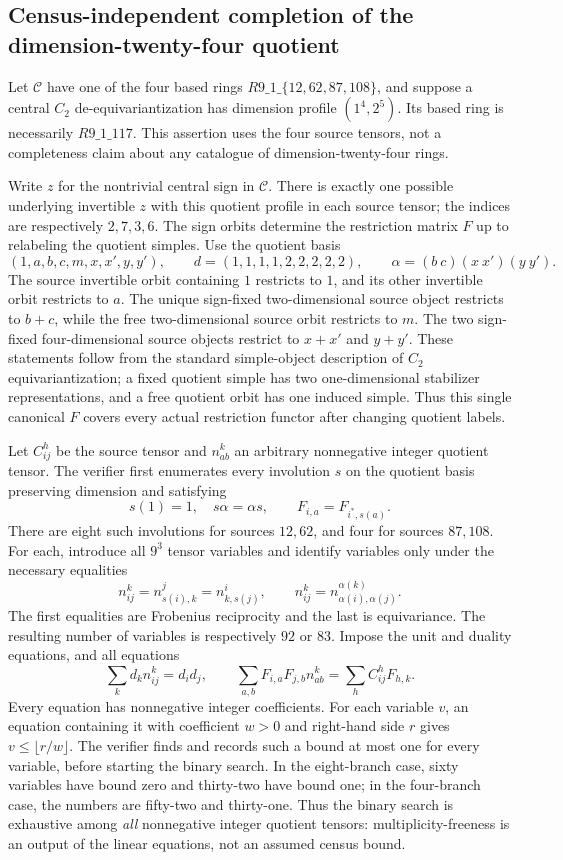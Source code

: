 \subsection{Census-independent completion of the dimension-twenty-four quotient}
\label{sec:direct-d24-quotient}
Let $\mathcal C$ have one of the four based rings
$R9\_1\_\{12,62,87,108\}$, and suppose a central $C_2$ de-equivariantization
has dimension profile $(1^4,2^5)$. Its based ring is necessarily
$R9\_1\_117$. This assertion uses the four source tensors, not a completeness
claim about any catalogue of dimension-twenty-four rings.

Write $z$ for the nontrivial central sign in $\mathcal C$. There is exactly
one possible underlying invertible $z$ with this quotient profile in each
source tensor; the indices are respectively $2,7,3,6$.
The sign orbits determine the restriction matrix $F$ up to relabeling the
quotient simples. Use the quotient basis
\[
 (1,a,b,c,m,x,x',y,y'),\qquad
 d=(1,1,1,1,2,2,2,2,2),\qquad
 \alpha=(b\ c)(x\ x')(y\ y').
\]
The source invertible orbit containing $1$ restricts to $1$, and its other
invertible orbit restricts to $a$. The unique sign-fixed two-dimensional
source object restricts to $b+c$, while the free two-dimensional source orbit
restricts to $m$. The two sign-fixed four-dimensional source objects restrict
to $x+x'$ and $y+y'$. These statements follow from the standard simple-object
description of $C_2$ equivariantization; a fixed quotient simple has two
one-dimensional stabilizer representations, and a free quotient orbit has
one induced simple. Thus this single canonical $F$ covers every actual
restriction functor after changing quotient labels.

Let $C_{ij}^h$ be the source tensor and $n_{ab}^k$ an arbitrary nonnegative
integer quotient tensor. The verifier first enumerates every involution
$s$ on the quotient basis preserving dimension and satisfying
\[
 s(1)=1,\quad s\alpha=\alpha s,\qquad
 F_{i,a}=F_{i^*,s(a)}.
\]
There are eight such involutions for sources $12,62$, and four for
sources $87,108$. For each, introduce all $9^3$ tensor variables and identify
variables only under the necessary equalities
\[
 n_{ij}^k=n_{s(i),k}^{j}=n_{k,s(j)}^{i},\qquad
 n_{ij}^k=n_{\alpha(i),\alpha(j)}^{\alpha(k)}.
\]
The first equalities are Frobenius reciprocity and the last is equivariance.
The resulting number of variables is respectively $92$ or $83$.
Impose the unit and duality equations, and all equations
\[
 \sum_k d_k n_{ij}^k=d_i d_j,
 \qquad
 \sum_{a,b}F_{i,a}F_{j,b}n_{ab}^k
       =\sum_h C_{ij}^h F_{h,k}.
\]
Every equation has nonnegative integer coefficients. For each variable $v$,
an equation containing it with coefficient $w>0$ and right-hand side $r$
gives $v\le\lfloor r/w\rfloor$. The verifier finds and records such a bound
at most one for every variable, before starting the binary search.
In the eight-branch case, sixty variables have bound zero and thirty-two
have bound one; in the four-branch case, the numbers are fifty-two and
thirty-one. Thus the binary search is exhaustive among \emph{all}
nonnegative integer quotient tensors: multiplicity-freeness is an output
of the linear equations, not an assumed census bound.

